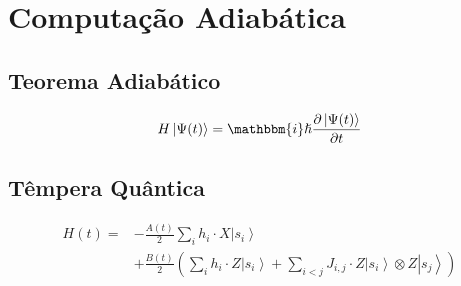 \documentclass[t]{beamer}
\newcommand{\ket}[1]{\ensuremath{\left|#1\right\rangle}}
\begin{document}
	\begin{frame}{\subsecname}
	
	\end{frame}	
	
	\begin{frame}{\subsecname}
	
	\end{frame}
	
	\section{Computação Adiabática}
	
	\subsection{Teorema Adiabático}
	
	\begin{frame}{\subsecname}
		
		\begin{align*}
			H \ket{\Psi(t)} =\mathbbm{i} \hslash \frac{\partial \ket{\Psi(t)}}{\partial t}
		\end{align*}
	\end{frame}
	
	\begin{frame}{\subsecname}
	
	\end{frame}	
	
	\begin{frame}{\subsecname}
	
	\end{frame}
	
	\begin{frame}{\subsecname}
	
	\end{frame}
	
	\subsection{Têmpera Quântica}	
	
	\begin{frame}{\subsecname}
		\begin{align*}
			H(t) = &-\frac{A(t)}{2}  \sum_{i} h_i \cdot X\ket{s_i}\\ &+ \frac{B(t)}{2}\left(\sum_{i} h_i \cdot Z\ket{s_i} + \sum_{i < j} J_{i,j} \cdot Z\ket{s_i} \otimes Z\ket{s_j}\right)
		\end{align*}
	\end{frame}
	
\end{document}
